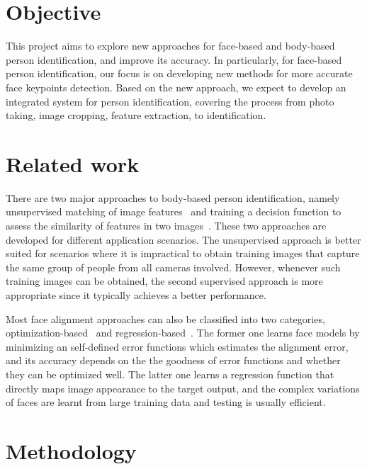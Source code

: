 \documentclass[pdftex,12pt,a4paper]{report}
\begin{document}
\section{Objective}
This project aims to explore new approaches for face-based and body-based person
identification, and improve its accuracy. In particularly, for face-based person
identification, our focus is on developing new methods for more accurate face
keypoints detection.
Based on the new approach, we expect
to develop an integrated system for person identification, covering the process
from photo taking, image cropping, feature extraction, to identification.

\section{Related work}
There are two major approaches to body-based person identification, namely unsupervised 
matching of image features~\cite{unsupervised_1, unsupervised_2,unsupervised_3} 
and training a decision function to assess the similarity of features in two
images~\cite{article_5,article_6,article_10}. 
These two approaches are developed for different application scenarios. The 
unsupervised approach is better suited for scenarios where it is impractical 
to obtain training images that capture the same group of people from all cameras 
involved. However, whenever such training images can be obtained, the second 
supervised approach is more appropriate since it typically achieves a better 
performance.

Most face alignment approaches can also be classified into two categories,
optimization-based~\cite{Matthews03activeappearance,saragih_goecke2007} and
regression-based~\cite{Cristinacce_boostedregression,so75978}. 
The former one learns face models by
minimizing an self-defined error functions which estimates the alignment error,
and its accuracy depends on the the goodness of error functions and whether they
can be optimized well. The latter one learns a regression function that directly
maps image appearance to the target output, and the complex variations of faces
are learnt from large training data and testing is usually efficient.

\section{Methodology}
\end{document}
